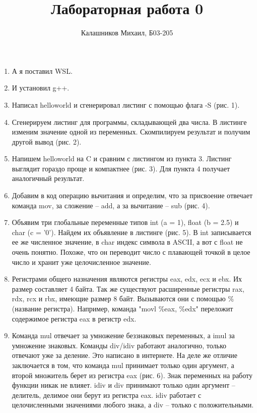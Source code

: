 \documentclass[a4paper,12pt]{article}
\title{Лабораторная работа 0}
\author{Калашников Михаил, Б03-205}
\date{}
\begin{document}

\begin{enumerate}

\setcounter{enumi}{0}

\item А я поставил WSL.

\item И установил g++.

\item Написал helloworld и сгенерировал листинг с помощью флага -S (рис. 1).

\item Сгенерируем листинг для программы, складывающей два числа. В листинге изменим значение одной из переменных. Скомпилируем результат и получим другой вывод (рис. 2).

\item Напишем helloworld на C и сравним с листингом из пункта 3. Листинг выглядит гораздо проще и компактнее (рис. 3). Для пункта 4 получает аналогичный результат.

\item Добавим в код операцию вычитания и определим, что за присвоение отвечает команда mov, за сложение -- add, а за вычитание -- sub (рис. 4).

\item Объявим три глобальные переменные типов int (a = 1), float (b = 2.5) и char (c = '0'). Найдем их объявление в листинге (рис. 5). В int записывается ее же численное значение, в char индекс символа в ASCII, а вот с float не очень понятно. Похоже, что он переводит число с плавающей точкой в целое число и хранит уже целочисленное значение.

\item Регистрами общего назначения являются регистры eax, edx, ecx и ebx. Их размер составляет 4 байта. Так же существуют расширенные регистры rax, rdx, rcx и rbx, имеющие размер 8 байт. Вызываются они с помощью \%(название регистра). Например, команда "movl	\%eax, \%edx" переложит содержимое регистра eax в регистр edx.

\item Команда mul отвечает за умножение беззнаковых переменных, а imul за умножение знаковых. Команды div/idiv работают аналогично, только отвечают уже за деление. Это написано в интернете. На деле же отличие заключается в том, что команда mul принимает только один аргумент, а второй множитель берет из регистра eax (рис. 6). Знак переменных на работу функции никак не влияет. idiv и div принимают только один аргумент -- делитель, делимое они берут из регистра eax. idiv работает с целочисленными значениями любого знака, а div -- только с положительными.

\end{enumerate}
\end{document}
